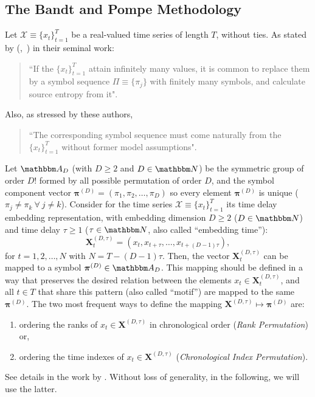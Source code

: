 \documentclass[alpha-refs]{wiley-article}
\newcommand{\Mycite}[1]{%
 (\citeauthor{#1},~\citeyear{#1})}
\begin{document}
\subsection{The Bandt and Pompe Methodology}\label{Sec:BPMethodology}

Let ${\mathcal X} \equiv \{x_t\}_{t=1}^{T}$ be a real-valued time series of length $T$, without ties. 
As stated by \Mycite{PermutationEntropyBandtPompe} in their seminal work:  
\begin{quote}
	``If the $\{x_t\}_{t=1}^{T}$ attain infinitely many values, it is common to replace them by a symbol sequence 
	$\Pi \equiv \{\pi_j\}$ with finitely many symbols, and calculate source entropy from it".
\end{quote}
Also, as stressed by these authors, 
\begin{quote}
	``The corresponding symbol sequence must come 
	naturally from the $\{x_t\}_{t=1}^{T}$ without former model assumptions".
\end{quote}

Let ${\mathbbm A}_{D}$ (with $D \geq 2$ and $D \in {\mathbbm N}$) be the symmetric group of order $D!$ formed by all 
possible permutation of order $D$, and the symbol component vector 
${\bm \pi}^{(D)} = (\pi_1, \pi_2, \dots, \pi_D)$ so every element ${\bm \pi}^{(D)}$ is unique 
($\pi_j \neq \pi_k~\forall~j \neq k$). 
Consider for the time series ${\mathcal X} \equiv \{x_t\}_{t=1}^{T}$ its time delay embedding representation,
with embedding dimension $D \geq 2$ ($D \in {\mathbbm N}$) and time delay $\tau \geq 1$ ($\tau \in {\mathbbm N}$, also called ``embedding time''):
\begin{equation} 
	{\mathbf X}^{(D,\tau)}_t =( x_t,x_{t+\tau},\dots,x_{t+(D-1)\tau} ) ,
	\label{eq:time-delay}
\end{equation} 
for $t = 1,2,\dots,N$ with $N = T-(D-1) \tau$.
Then, the vector ${\mathbf X}^{(D,\tau)}_t$ can be mapped to a symbol ${\bm \pi}^{(D)} \in {\mathbbm A}_{D}$. 
This mapping should be defined in a way that preserves the desired relation between the elements 
$x_t  \in {\mathbf X}^{(D,\tau)}_t$, and all $t \in T$ that share this pattern (also called ``motif'') are mapped to the same 
${\bm \pi}^{(D)}$. 
The two most frequent ways to define the mapping ${\mathbf X}^{(D,\tau)} \mapsto {\bm \pi}^{(D)}$ are:  
\begin{enumerate}[label=\alph*)]
	\item ordering the ranks of $x_t \in {\mathbf X}^{(D,\tau)}$ in chronological order 
	(\textit{Rank Permutation}) or,
	\item ordering the time indexes of $x_t \in {\mathbf X}^{(D,\tau)}$  
	(\textit{Chronological Index Permutation}).
\end{enumerate}
See details in the work by \citet{BPRepeatedValuesChaos}.
Without loss of generality, in the following, we will use the latter.
\end{document}

